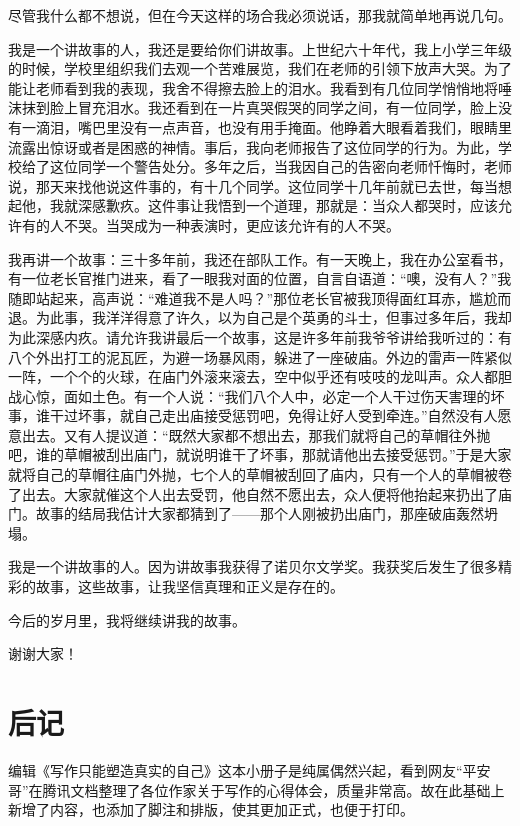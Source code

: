 \documentclass[fontset=fandol,12pt,a5paper]{ctexbook}
\begin{document}
尽管我什么都不想说，但在今天这样的场合我必须说话，那我就简单地再说几句。

我是一个讲故事的人，我还是要给你们讲故事。上世纪六十年代，我上小学三年级的时候，学校里组织我们去观一个苦难展览，我们在老师的引领下放声大哭。为了能让老师看到我的表现，我舍不得擦去脸上的泪水。我看到有几位同学悄悄地将唾沫抹到脸上冒充泪水。我还看到在一片真哭假哭的同学之间，有一位同学，脸上没有一滴泪，嘴巴里没有一点声音，也没有用手掩面。他睁着大眼看着我们，眼睛里流露出惊讶或者是困惑的神情。事后，我向老师报告了这位同学的行为。为此，学校给了这位同学一个警告处分。多年之后，当我因自己的告密向老师忏悔时，老师说，那天来找他说这件事的，有十几个同学。这位同学十几年前就已去世，每当想起他，我就深感歉疚。这件事让我悟到一个道理，那就是：当众人都哭时，应该允许有的人不哭。当哭成为一种表演时，更应该允许有的人不哭。

我再讲一个故事：三十多年前，我还在部队工作。有一天晚上，我在办公室看书，有一位老长官推门进来，看了一眼我对面的位置，自言自语道：“噢，没有人？”我随即站起来，高声说：“难道我不是人吗？”那位老长官被我顶得面红耳赤，尴尬而退。为此事，我洋洋得意了许久，以为自己是个英勇的斗士，但事过多年后，我却为此深感内疚。请允许我讲最后一个故事，这是许多年前我爷爷讲给我听过的：有八个外出打工的泥瓦匠，为避一场暴风雨，躲进了一座破庙。外边的雷声一阵紧似一阵，一个个的火球，在庙门外滚来滚去，空中似乎还有吱吱的龙叫声。众人都胆战心惊，面如土色。有一个人说：“我们八个人中，必定一个人干过伤天害理的坏事，谁干过坏事，就自己走出庙接受惩罚吧，免得让好人受到牵连。”自然没有人愿意出去。又有人提议道：“既然大家都不想出去，那我们就将自己的草帽往外抛吧，谁的草帽被刮出庙门，就说明谁干了坏事，那就请他出去接受惩罚。”于是大家就将自己的草帽往庙门外抛，七个人的草帽被刮回了庙内，只有一个人的草帽被卷了出去。大家就催这个人出去受罚，他自然不愿出去，众人便将他抬起来扔出了庙门。故事的结局我估计大家都猜到了——那个人刚被扔出庙门，那座破庙轰然坍塌。

我是一个讲故事的人。因为讲故事我获得了诺贝尔文学奖。我获奖后发生了很多精彩的故事，这些故事，让我坚信真理和正义是存在的。

今后的岁月里，我将继续讲我的故事。

谢谢大家！

\newpage

\section{后记}

编辑《写作只能塑造真实的自己》这本小册子是纯属偶然兴起，看到网友“平安哥”在腾讯文档整理了各位作家关于写作的心得体会，质量非常高。故在此基础上新增了内容，也添加了脚注和排版，使其更加正式，也便于打印。
\end{document}
